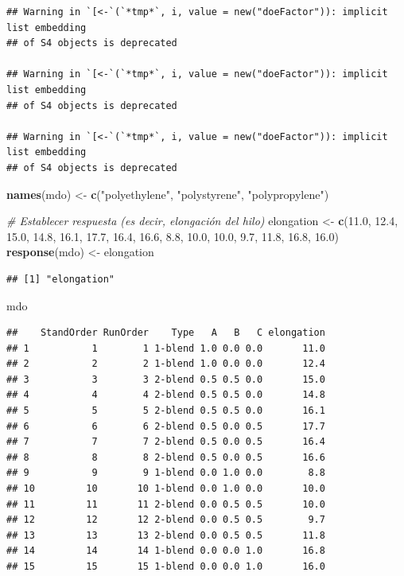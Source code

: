 \documentclass[
]{book}
\newenvironment{Shaded}{\begin{snugshade}}{\end{snugshade}}
\newcommand{\CommentTok}[1]{\textcolor[rgb]{0.56,0.35,0.01}{\textit{#1}}}
\newcommand{\FloatTok}[1]{\textcolor[rgb]{0.00,0.00,0.81}{#1}}
\newcommand{\FunctionTok}[1]{\textcolor[rgb]{0.13,0.29,0.53}{\textbf{#1}}}
\newcommand{\NormalTok}[1]{#1}
\newcommand{\OtherTok}[1]{\textcolor[rgb]{0.56,0.35,0.01}{#1}}
\newcommand{\StringTok}[1]{\textcolor[rgb]{0.31,0.60,0.02}{#1}}
\begin{document}
\begin{verbatim}
## Warning in `[<-`(`*tmp*`, i, value = new("doeFactor")): implicit list embedding
## of S4 objects is deprecated

## Warning in `[<-`(`*tmp*`, i, value = new("doeFactor")): implicit list embedding
## of S4 objects is deprecated

## Warning in `[<-`(`*tmp*`, i, value = new("doeFactor")): implicit list embedding
## of S4 objects is deprecated
\end{verbatim}

\begin{Shaded}
\begin{Highlighting}[]
\FunctionTok{names}\NormalTok{(mdo) }\OtherTok{\textless{}{-}} \FunctionTok{c}\NormalTok{(}\StringTok{"polyethylene"}\NormalTok{, }\StringTok{"polystyrene"}\NormalTok{, }\StringTok{"polypropylene"}\NormalTok{)}

\CommentTok{\# Establecer respuesta (es decir, elongación del hilo)}
\NormalTok{elongation }\OtherTok{\textless{}{-}} \FunctionTok{c}\NormalTok{(}\FloatTok{11.0}\NormalTok{, }\FloatTok{12.4}\NormalTok{, }\FloatTok{15.0}\NormalTok{, }\FloatTok{14.8}\NormalTok{, }\FloatTok{16.1}\NormalTok{, }\FloatTok{17.7}\NormalTok{, }\FloatTok{16.4}\NormalTok{, }\FloatTok{16.6}\NormalTok{, }\FloatTok{8.8}\NormalTok{, }\FloatTok{10.0}\NormalTok{, }\FloatTok{10.0}\NormalTok{, }\FloatTok{9.7}\NormalTok{, }\FloatTok{11.8}\NormalTok{, }\FloatTok{16.8}\NormalTok{, }\FloatTok{16.0}\NormalTok{)}
\FunctionTok{response}\NormalTok{(mdo) }\OtherTok{\textless{}{-}}\NormalTok{ elongation}
\end{Highlighting}
\end{Shaded}

\begin{verbatim}
## [1] "elongation"
\end{verbatim}

\begin{Shaded}
\begin{Highlighting}[]
\NormalTok{mdo}
\end{Highlighting}
\end{Shaded}

\begin{verbatim}
##    StandOrder RunOrder    Type   A   B   C elongation
## 1           1        1 1-blend 1.0 0.0 0.0       11.0
## 2           2        2 1-blend 1.0 0.0 0.0       12.4
## 3           3        3 2-blend 0.5 0.5 0.0       15.0
## 4           4        4 2-blend 0.5 0.5 0.0       14.8
## 5           5        5 2-blend 0.5 0.5 0.0       16.1
## 6           6        6 2-blend 0.5 0.0 0.5       17.7
## 7           7        7 2-blend 0.5 0.0 0.5       16.4
## 8           8        8 2-blend 0.5 0.0 0.5       16.6
## 9           9        9 1-blend 0.0 1.0 0.0        8.8
## 10         10       10 1-blend 0.0 1.0 0.0       10.0
## 11         11       11 2-blend 0.0 0.5 0.5       10.0
## 12         12       12 2-blend 0.0 0.5 0.5        9.7
## 13         13       13 2-blend 0.0 0.5 0.5       11.8
## 14         14       14 1-blend 0.0 0.0 1.0       16.8
## 15         15       15 1-blend 0.0 0.0 1.0       16.0
\end{verbatim}
\end{document}
